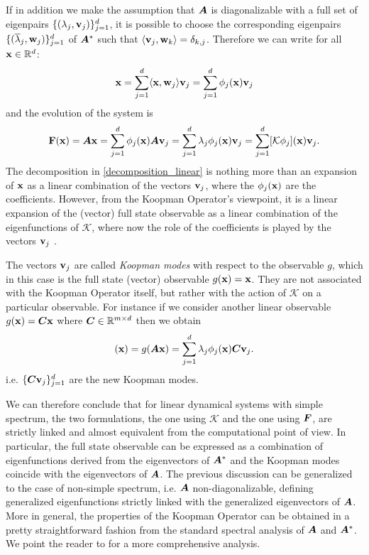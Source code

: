 If in addition we make the assumption that $\vb*{A}$ is diagonalizable with a full set of eigenpairs $\{(\lambda_j, \vb{v}_j)\}_{j=1}^{d}$, it is possible to choose the corresponding eigenpairs $\{(\overline{\lambda}_j, \vb{w}_j)\}_{j=1}^{d}$ of $\vb*{A}^*$ such that $\langle \vb{v}_j, \vb{w}_k\rangle = \delta_{k,j}$. Therefore we can write for all $\vb{x}\in\mathbb{R}^d$:
\begin{equation}
    \label{decomposition_linear}
    \vb{x} = \sum_{j=1}^d \langle \vb{x}, \vb{w}_j\rangle \vb{v}_j = \sum_{j=1}^d \phi_j(\vb{x}) \vb{v}_j
\end{equation}
and the evolution of the system is
\begin{equation}
    \label{evolution_linear}
    \vb{F}(\vb{x}) = \vb*{A}\vb{x}  = \sum_{j=1}^d \phi_j(\vb{x}) \vb*{A}\vb{v}_j = \sum_{j=1}^d \lambda_j \phi_j(\vb{x}) \vb{v}_j = \sum_{j=1}^d [\mathcal{K}\phi_j](\vb{x})\vb{v}_j.
\end{equation}
The decomposition in \eqref{decomposition_linear} is nothing more than an expansion of $\vb{x}$ as a linear combination of the vectors $\vb{v}_j$, where the $\phi_j(\vb{x})$ are the coefficients. However, from the Koopman Operator's viewpoint, it is a linear expansion of the (vector) full state observable as a linear combination of the eigenfunctions of $\mathcal{K}$, where now the role of the coefficients is played by the vectors $\vb{v}_j$ \cite{rowley_spectral_2009}. 

The vectors $\vb{v}_j$ are called \emph{Koopman modes} with respect to the observable $g$, which in this case is the full state (vector) observable $g(\vb{x}) = \vb{x}$. They are not associated with the Koopman Operator itself, but rather with the action of $\mathcal{K}$ on a particular observable. For instance if we consider another linear observable $g(\vb{x}) = \vb*{C}\vb{x}$ where $\vb*{C}\in\mathbb{R}^{m \times d}$ then we obtain
\begin{equation*}
	[\mathcal{K}g](\vb{x}) = g(\vb*{A}\vb{x})  = \sum_{j=1}^d \lambda_j \phi_j(\vb{x}) \vb*{C}\vb{v}_j.
\end{equation*}
i.e. $\{\vb*{C}\vb{v}_j\}_{j = 1}^d$ are the new Koopman modes.

We can therefore conclude that for linear dynamical systems with simple spectrum, the two formulations, the one using $\mathcal{K}$ and the one using $\vb*{F}$, are strictly linked and almost equivalent from the computational point of view. In particular, the full state observable can be expressed as a combination of eigenfunctions derived from the eigenvectors of $\vb*{A}^*$ and the Koopman modes coincide with the eigenvectors of $\vb*{A}$. The previous discussion can be generalized to the case of non-simple spectrum, i.e. $\vb*{A}$ non-diagonalizable, defining generalized eigenfunctions strictly linked with the generalized eigenvectors of $\vb*{A}$. More in general, the properties of the Koopman Operator can be obtained in a pretty straightforward fashion from the standard spectral analysis of $\vb*{A}$ and $\vb*{A}^*$. We point the reader to \cite{mezic_spectrum_2019} for a more comprehensive analysis.

